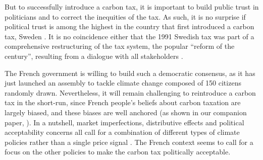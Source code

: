 \documentclass[english,5p,authoryear]{elsarticle}
\begin{document}
But to successfully introduce a carbon tax, it is important to build public trust in politicians \citep{harring_jagers_2013,rafaty_perceptions_2018} and to correct the inequities of the tax. As such, it is no surprise if political trust is among the highest in the country that first introduced a carbon tax, Sweden \citep{klenert_making_2018}. It is no coincidence either that the 1991 Swedish tax was part of a comprehensive restructuring of the tax system, the popular ``reform of the century'', resulting from a dialogue with all stakeholders \citep{sterner_environmental_2014}. 

The French government is willing to build such a democratic consensus, as it has just launched an assembly to tackle climate change composed of 150 citizens randomly drawn. Nevertheless, it will remain challenging to reintroduce a carbon tax in the short-run, since French people's beliefs about carbon taxation are largely biased, and these biases are well anchored (as shown in our companion paper, \citealt{douenne_can_2019}). In a nutshell, market imperfections, distributive effects and political acceptability concerns all call for a combination of different types of climate policies rather than a single price signal \citep{stern_report_2017,stiglitz_addressing_2019}. The French context seems to call for a focus on the other policies to make the carbon tax politically acceptable. %


\end{document}
